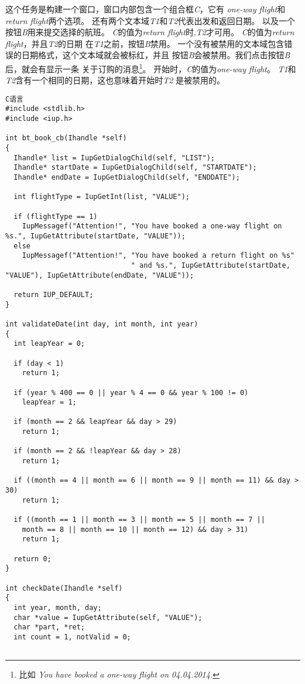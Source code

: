 \documentclass{ctexart}
\begin{document}
这个任务是构建一个窗口，窗口内部包含一个组合框\emph{C}，它有
\emph{one-way flight}和\emph{return flight}两个选项。
还有两个文本域\emph{T1}和\emph{T2}代表出发和返回日期。
以及一个按钮\emph{B}用来提交选择的航班。
\emph{C}的值为\emph{return flight}时,\emph{T2}才可用。
\emph{C}的值为\emph{return flight}，并且\emph{T2}的日期
在\emph{T1}之前，按钮\emph{B}禁用。
一个没有被禁用的文本域包含错误的日期格式，这个文本域就会被标红，并且
按钮\emph{B}会被禁用。我们点击按钮\emph{B}后，就会有显示一条
关于订购的消息\footnote{比如
\emph{You have booked a one-way flight on 04.04.2014.}}。
开始时，\emph{C}的值为\emph{one-way flight}。
\emph{T1}和\emph{T2}含有一个相同的日期，这也意味着开始时\emph{T2}
是被禁用的。

\lstset{language=C}
\begin{lstlisting}
C语言
#include <stdlib.h>
#include <iup.h>

int bt_book_cb(Ihandle *self)
{
  Ihandle* list = IupGetDialogChild(self, "LIST");
  Ihandle* startDate = IupGetDialogChild(self, "STARTDATE");
  Ihandle* endDate = IupGetDialogChild(self, "ENDDATE");

  int flightType = IupGetInt(list, "VALUE");

  if (flightType == 1)
    IupMessagef("Attention!", "You have booked a one-way flight on %s.", IupGetAttribute(startDate, "VALUE"));
  else
    IupMessagef("Attention!", "You have booked a return flight on %s"
                              " and %s.", IupGetAttribute(startDate, "VALUE"), IupGetAttribute(endDate, "VALUE"));

  return IUP_DEFAULT;
}

int validateDate(int day, int month, int year)
{
  int leapYear = 0;

  if (day < 1)
    return 1;

  if (year % 400 == 0 || year % 4 == 0 && year % 100 != 0)
    leapYear = 1;

  if (month == 2 && leapYear && day > 29)
    return 1;

  if (month == 2 && !leapYear && day > 28)
    return 1;

  if ((month == 4 || month == 6 || month == 9 || month == 11) && day > 30)
    return 1;

  if ((month == 1 || month == 3 || month == 5 || month == 7 ||
    month == 8 || month == 10 || month == 12) && day > 31)
    return 1;

  return 0;
}

int checkDate(Ihandle *self)
{
  int year, month, day;
  char *value = IupGetAttribute(self, "VALUE");
  char *part, *ret;
  int count = 1, notValid = 0;


\end{lstlisting}
\end{document}
